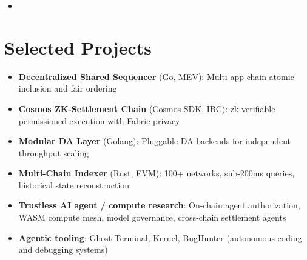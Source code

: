\documentclass[11pt,a4paper,sans]{moderncv}
\begin{document}
\begin{itemize}
\vspace{3pt}

\item{}

\end{itemize}

\section{Selected Projects}
\vspace{1pt}
\begin{itemize}
\item \textbf{Decentralized Shared Sequencer} (Go, MEV): Multi-app-chain atomic inclusion and fair ordering
\item \textbf{Cosmos ZK-Settlement Chain} (Cosmos SDK, IBC): zk-verifiable permissioned execution with Fabric privacy
\item \textbf{Modular DA Layer} (Golang): Pluggable DA backends for independent throughput scaling
\item \textbf{Multi-Chain Indexer} (Rust, EVM): 100+ networks, sub-200ms queries, historical state reconstruction
\item \textbf{Trustless AI agent / compute research}: On-chain agent authorization, WASM compute mesh, model governance, cross-chain settlement agents
\item \textbf{Agentic tooling}: Ghost Terminal, Kernel, BugHunter (autonomous coding and debugging systems)
\end{itemize}
\end{document}
